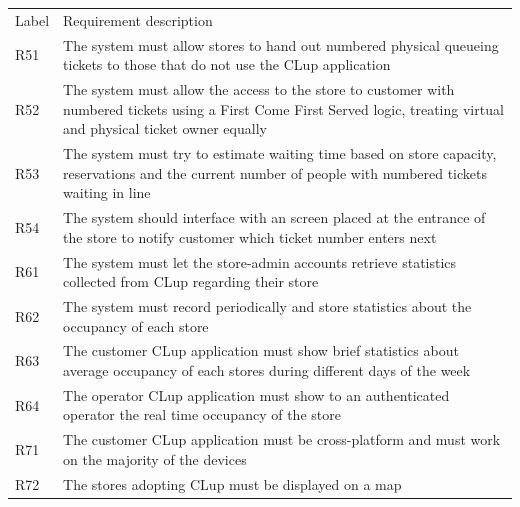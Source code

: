 \pagebreak

\begin{tabular}{C{1cm}L{14.1cm}}
    Label & Requirement description                                                                                                                                                         \\
    R51   & The system must allow stores to hand out numbered physical queueing tickets to those that do not use the CLup application                                                       \\
    R52   & The system must allow the access to the store to customer with numbered tickets using a First Come First Served logic, treating virtual and physical ticket owner equally       \\
    R53   & The system must try to estimate waiting time based on store capacity, reservations and the current number of people with numbered tickets waiting in line                       \\
    R54   & The system should interface with an screen placed at the entrance of the store to notify customer which ticket number enters next                                               \\
    R61   & The system must let the store-admin accounts retrieve statistics collected from CLup regarding their store                                                                      \\
    R62   & The system must record periodically and store statistics about the occupancy of each store                                                                                      \\
    R63   & The customer CLup application must show brief statistics about average occupancy of each stores during different days of the week                                               \\
    R64   & The operator CLup application must show to an authenticated operator the real time occupancy of the store                                                                       \\
    R71   & The customer CLup application must be cross-platform and must work on the majority of the devices                                                                               \\
    R72   & The stores adopting CLup must be displayed on a map                                                                                                                             \\

\end{tabular}
